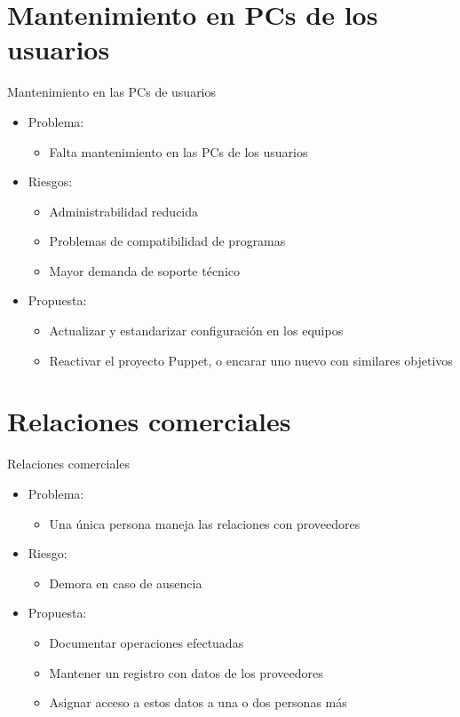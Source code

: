 \documentclass[spanish]{beamer}
\begin{document}
\section{Mantenimiento en PCs de los usuarios}
\begin{frame}{Mantenimiento en las PCs de usuarios}
  \begin{itemize}
  \item Problema:
    \begin{itemize}
    \item Falta mantenimiento en las PCs de los usuarios
    \end{itemize}
  \item Riesgos:
    \begin{itemize}
    \item Administrabilidad reducida
    \item Problemas de compatibilidad de programas
    \item Mayor demanda de soporte técnico
    \end{itemize}
  \item Propuesta:
    \begin{itemize}
    \item Actualizar y estandarizar configuración en los equipos
    \item Reactivar el proyecto Puppet, o encarar uno nuevo con
      similares objetivos
    \end{itemize}
  \end{itemize}
\end{frame}


\section{Relaciones comerciales}
\begin{frame}{Relaciones comerciales}
  \begin{itemize}
  \item Problema:
    \begin{itemize}
    \item Una única persona maneja las relaciones con proveedores
    \end{itemize}
  \item Riesgo:
    \begin{itemize}
    \item Demora en caso de ausencia
    \end{itemize}  
  \item Propuesta:
    \begin{itemize}
    \item Documentar operaciones efectuadas
    \item Mantener un registro con datos de los proveedores
    \item Asignar acceso a estos datos a una o dos personas más
    \end{itemize}
  \end{itemize}
\end{frame}
\end{document}
